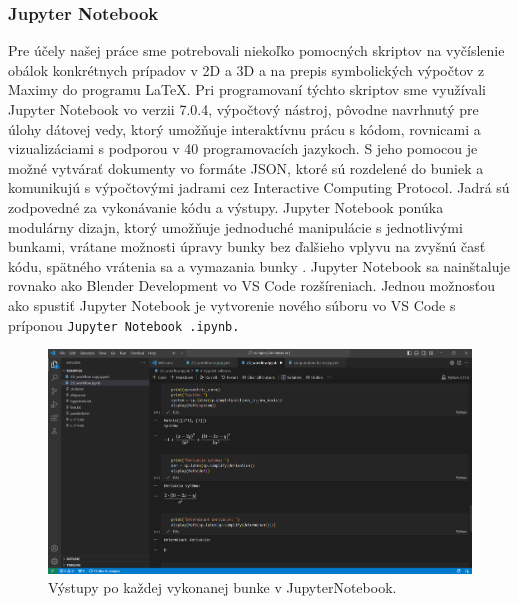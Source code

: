 \subsubsection{Jupyter Notebook}
Pre účely našej práce sme potrebovali niekoľko pomocných skriptov na vyčíslenie obálok konkrétnych prípadov v 2D a 3D a na prepis symbolických výpočtov z Maximy do programu \LaTeX. Pri programovaní týchto skriptov sme využívali Jupyter Notebook vo verzii 7.0.4, výpočtový nástroj, pôvodne navrhnutý pre úlohy dátovej vedy, ktorý umožňuje interaktívnu prácu s kódom, rovnicami a vizualizáciami s podporou v 40 programovacích jazykoch. S jeho pomocou je možné vytvárať dokumenty vo formáte JSON, ktoré sú rozdelené do buniek a komunikujú s výpočtovými jadrami cez Interactive Computing Protocol. Jadrá sú zodpovedné za vykonávanie kódu a výstupy. Jupyter Notebook ponúka modulárny dizajn, ktorý umožňuje jednoduché manipulácie s jednotlivými bunkami, vrátane možnosti úpravy bunky bez ďalšieho vplyvu na zvyšnú časť kódu, spätného vrátenia sa a vymazania bunky \cite{Jupyter}. Jupyter Notebook sa nainštaluje rovnako ako Blender Development vo VS Code rozšíreniach. 
Jednou možnosťou ako spustiť Jupyter Notebook je vytvorenie nového súboru vo VS Code s príponou \verb|Jupyter Notebook .ipynb.| 
\begin{figure}[h]
	\centering
	\includegraphics[width=\textwidth]{images/jupyter.png}
	\caption[Jupyter Notebook.]{Výstupy po každej vykonanej bunke v JupyterNotebook.}
	\label{fig:jupyter}
\end{figure}

